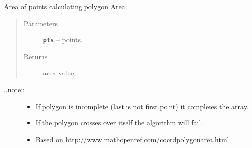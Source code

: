 \documentclass[letterpaper,10pt,english]{sphinxmanual}
\begin{document}
\begin{fulllineitems}
\label{RRtoolbox.lib.arrayops:RRtoolbox.lib.arrayops.basic.polygonArea}
Area of points calculating polygon Area.
\begin{quote}\begin{description}
\item[{Parameters}] \leavevmode
\textbf{\texttt{pts}} -- points.

\item[{Returns}] \leavevmode
area value.

\end{description}\end{quote}
\begin{description}
\item[{..note::}] \leavevmode\begin{itemize}
\item {} 
If polygon is incomplete (last is not first point) it completes the array.

\item {} 
If the polygon crosses over itself the algorithm will fail.

\item {} 
Based on \href{http://www.mathopenref.com/coordpolygonarea.html}{http://www.mathopenref.com/coordpolygonarea.html}

\end{itemize}

\end{description}

\end{fulllineitems}

\end{document}
